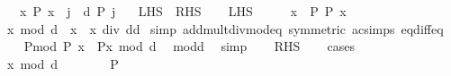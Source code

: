 \begin{isabellebody}
\ \ \ {\isachardoublequoteopen}{\isacharparenleft}{\kern0pt}{\isasymexists}x{\isachardot}{\kern0pt}\ P\ x{\isacharparenright}{\kern0pt}\ {\isacharequal}{\kern0pt}\ {\isacharparenleft}{\kern0pt}{\isasymexists}j\ {\isasymin}\ {\isacharbraceleft}{\kern0pt}{}{\isachardot}{\kern0pt}{\isachardot}{\kern0pt}d{\isacharbraceright}{\kern0pt}{\isachardot}{\kern0pt}\ P\ j{\isacharparenright}{\kern0pt}{\isachardoublequoteclose}\isanewline
\ \ {\isacharparenleft}{\kern0pt}\ {\isachardoublequoteopen}{\isacharquery}{\kern0pt}LHS\ {\isacharequal}{\kern0pt}\ {\isacharquery}{\kern0pt}RHS{\isachardoublequoteclose}{\isacharparenright}{\kern0pt}\isanewline
%
\isadelimproof
%
\endisadelimproof
%
\isatagproof
{}\isamarkupfalse%
\isanewline
\ \ \isamarkupfalse%
\ {\isacharquery}{\kern0pt}LHS\isanewline
\ \ \isamarkupfalse%
\ \isamarkupfalse%
\ x\ \ P{\isacharcolon}{\kern0pt}\ {\isachardoublequoteopen}P\ x{\isachardoublequoteclose}\ \isacommand{{\isachardot}{\kern0pt}{\isachardot}{\kern0pt}}\isamarkupfalse%
\isanewline
\ \ \isamarkupfalse%
\ {\isachardoublequoteopen}x\ mod\ d\ {\isacharequal}{\kern0pt}\ x\ {\isacharminus}{\kern0pt}\ {\isacharparenleft}{\kern0pt}x\ div\ d{\isacharparenright}{\kern0pt}{\isacharasterisk}{\kern0pt}d{\isachardoublequoteclose}\ \isamarkupfalse%
{\isacharparenleft}{\kern0pt}simp\ add{\isacharcolon}{\kern0pt}mult{\isacharunderscore}{\kern0pt}div{\isacharunderscore}{\kern0pt}mod{\isacharunderscore}{\kern0pt}eq\ {\isacharbrackleft}{\kern0pt}symmetric{\isacharbrackright}{\kern0pt}\ ac{\isacharunderscore}{\kern0pt}simps\ eq{\isacharunderscore}{\kern0pt}diff{\isacharunderscore}{\kern0pt}eq{\isacharparenright}{\kern0pt}\isanewline
\ \ \isamarkupfalse%
\ Pmod{\isacharcolon}{\kern0pt}\ {\isachardoublequoteopen}P\ x\ {\isacharequal}{\kern0pt}\ P{\isacharparenleft}{\kern0pt}x\ mod\ d{\isacharparenright}{\kern0pt}{\isachardoublequoteclose}\ \isamarkupfalse%
\ modd\ \isamarkupfalse%
\ simp\isanewline
\ \ \isamarkupfalse%
\ {\isacharquery}{\kern0pt}RHS\isanewline
\ \ \isamarkupfalse%
\ {\isacharparenleft}{\kern0pt}cases{\isacharparenright}{\kern0pt}\isanewline
\ \ \ \ \isamarkupfalse%
\ {\isachardoublequoteopen}x\ mod\ d\ {\isacharequal}{\kern0pt}\ {}{\isachardoublequoteclose}\isanewline
\ \ \ \ \isamarkupfalse%
\ {\isachardoublequoteopen}P\ {}{\isachardoublequoteclose}\ \isamarkupfalse%

\end{isabellebody}
